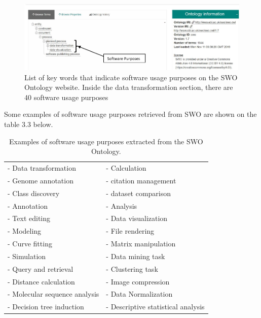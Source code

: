\begin{figure}[htbp]
	\centering
	\includegraphics[width=1\textwidth]{4.graphics/figures/ch_3/SWO2}
	\caption{List of key words that indicate software usage purposes on the SWO Ontology website. Inside the data transformation section, there are 40 software usage purposes}
	\label{fig:chapter03:setup}
\end{figure}

Some examples of software usage purposes retrieved from SWO are shown on the table 3.3 below.

\begin{table}[h!]
	\begin{center}
		\caption{Examples of software usage purposes extracted from the SWO Ontology.}
		\label{tab:table1}
		\begin{tabular}{|l|l|} %
			
			\hline
			- Data transformation & - Calculation  \\
			- Genome annotation   & - citation management  \\
			- Class discovery     & - dataset comparison   \\
			- Annotation          & - Analysis \\
			- Text editing        & - Data visualization  \\
			- Modeling           & - File rendering   \\
			- Curve fitting       & - Matrix manipulation  \\
			- Simulation          & - Data mining task   \\
			- Query and retrieval & - Clustering task \\
			- Distance calculation & - Image compression \\
			- Molecular sequence analysis & - Data Normalization \\
			- Decision tree induction & - Descriptive statistical analysis \\
			
			\hline
		\end{tabular}
	\end{center}
\end{table}

